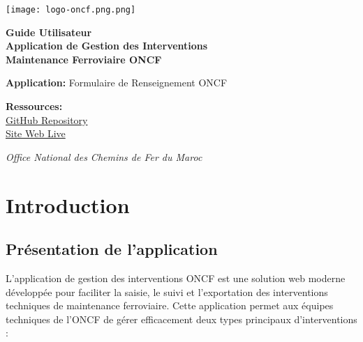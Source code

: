 \documentclass[12pt,a4paper]{report}
\begin{document}
\begin{titlepage}
    \centering
    \vspace*{2cm}
    
    \centering
   \texttt{[image: logo-oncf.png.png]}
    
    \vspace{2cm}
    
    {\Huge\bfseries\color{oncf-dark-blue} Guide Utilisateur}\\[0.5cm]
    {\LARGE\bfseries\color{oncf-orange} Application de Gestion des Interventions}\\[0.3cm]
    {\Large\bfseries\color{oncf-blue} Maintenance Ferroviaire ONCF}\\[2cm]
    
    \vspace{2cm}
    
    \begin{minipage}{0.8\textwidth}
        \centering
        \textbf{Application:} Formulaire de Renseignement ONCF\\
        \vspace{1cm}
        
        \textbf{Ressources:}\\
        \href{https://github.com/yzdpirate28/formulaire_renseignement_oncf}{GitHub Repository}\\
        \href{https://formulaire-renseignement-oncf.vercel.app/}{Site Web Live}
    \end{minipage}
    
    \vfill
    
    {\large\itshape Office National des Chemins de Fer du Maroc}
\end{titlepage}

\tableofcontents
\newpage

\chapter{Introduction}

\section{Présentation de l'application}

L'application de gestion des interventions ONCF est une solution web moderne développée pour faciliter la saisie, le suivi et l'exportation des interventions techniques de maintenance ferroviaire. Cette application permet aux équipes techniques de l'ONCF de gérer efficacement deux types principaux d'interventions :
\end{document}
